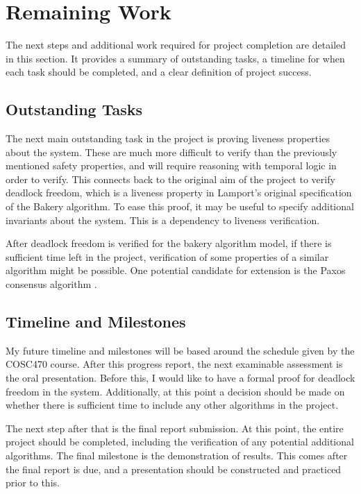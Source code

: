 \documentclass{article}
\theoremstyle{definition}
\begin{document}
\section{Remaining Work}
    The next steps and additional work required for project completion are detailed in this section.
    It provides a summary of outstanding tasks, a timeline for when each task should be completed,
    and a clear definition of project success.

    \subsection{Outstanding Tasks}
        The next main outstanding task in the project is proving liveness properties about the system.
        These are much more difficult to verify than the previously mentioned safety properties, 
        and will require reasoning with temporal logic in order to verify.
        This connects back to the original aim of the project to verify deadlock freedom, 
        which is a liveness property in Lamport's original specification of the Bakery algorithm.
        To ease this proof, it may be useful to specify additional invariants about the system.
        This is a dependency to liveness verification.

        After deadlock freedom is verified for the bakery algorithm model, 
        if there is sufficient time left in the project, verification of some properties of a similar algorithm might be possible.
        One potential candidate for extension is the Paxos consensus algorithm \cite{lamport2001paxos}.

    \subsection{Timeline and Milestones}

        My future timeline and milestones will be based around the schedule given by the COSC470 course.
        After this progress report, the next examinable assessment is the oral presentation.
        Before this, I would like to have a formal proof for deadlock freedom in the system.
        Additionally, at this point a decision should be made on whether there is sufficient time to include 
        any other algorithms in the project.

        The next step after that is the final report submission.
        At this point, the entire project should be completed, including the verification of any potential additional algorithms.
        The final milestone is the demonstration of results. 
        This comes after the final report is due, and a presentation should be constructed and practiced prior to this.
\end{document}
